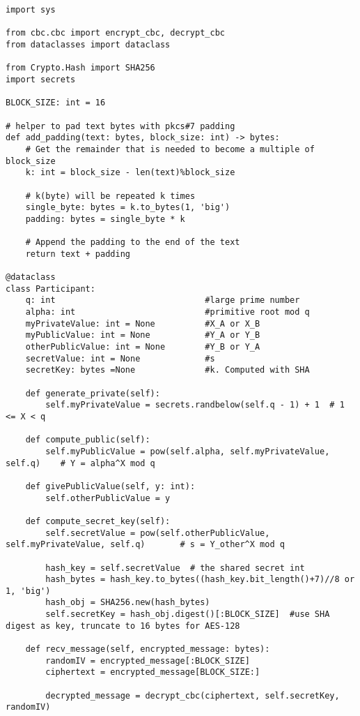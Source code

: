 \documentclass[11pt]{article}
\begin{document}
\begin{lstlisting}
import sys

from cbc.cbc import encrypt_cbc, decrypt_cbc
from dataclasses import dataclass

from Crypto.Hash import SHA256
import secrets

BLOCK_SIZE: int = 16

# helper to pad text bytes with pkcs#7 padding
def add_padding(text: bytes, block_size: int) -> bytes:
    # Get the remainder that is needed to become a multiple of block_size
    k: int = block_size - len(text)%block_size

    # k(byte) will be repeated k times
    single_byte: bytes = k.to_bytes(1, 'big')
    padding: bytes = single_byte * k

    # Append the padding to the end of the text 
    return text + padding 

@dataclass 
class Participant:
    q: int                              #large prime number
    alpha: int                          #primitive root mod q
    myPrivateValue: int = None          #X_A or X_B
    myPublicValue: int = None           #Y_A or Y_B
    otherPublicValue: int = None        #Y_B or Y_A
    secretValue: int = None             #s
    secretKey: bytes =None              #k. Computed with SHA

    def generate_private(self):
        self.myPrivateValue = secrets.randbelow(self.q - 1) + 1  # 1 <= X < q

    def compute_public(self):
        self.myPublicValue = pow(self.alpha, self.myPrivateValue, self.q)    # Y = alpha^X mod q

    def givePublicValue(self, y: int):
        self.otherPublicValue = y

    def compute_secret_key(self):
        self.secretValue = pow(self.otherPublicValue, self.myPrivateValue, self.q)       # s = Y_other^X mod q

        hash_key = self.secretValue  # the shared secret int
        hash_bytes = hash_key.to_bytes((hash_key.bit_length()+7)//8 or 1, 'big')
        hash_obj = SHA256.new(hash_bytes)
        self.secretKey = hash_obj.digest()[:BLOCK_SIZE]  #use SHA digest as key, truncate to 16 bytes for AES-128
    
    def recv_message(self, encrypted_message: bytes):
        randomIV = encrypted_message[:BLOCK_SIZE]
        ciphertext = encrypted_message[BLOCK_SIZE:]

        decrypted_message = decrypt_cbc(ciphertext, self.secretKey, randomIV)


\end{lstlisting}
\end{document}
